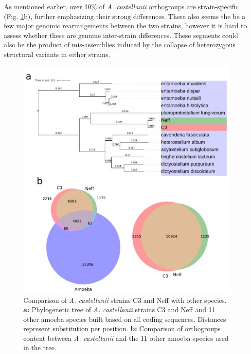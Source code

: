 As mentioned earlier, over 10\% of \textit{A. castellanii} orthogroups are strain-specific (Fig. \ref{fig:02-02:acas-comp}b), further emphasizing their strong differences. There also seems the be a few major genomic rearrangements between the two strains, however it is hard to assess whether these are genuine inter-strain differences. These segments could also be the product of mis-assemblies induced by the collapse of heterozygous structural variants in either strains.



\begin{figure}[htb]
    \includegraphics[width=\textwidth]{Parts/Part02/gfx/acas_comparative_genomics.pdf}
    \caption[Comparative genomics of \textit{A. castellanii}.]{Comparison of \textit{A. castellanii} strains C3 and Neff with other species. \textbf{a:} Phylogenetic tree of \textit{A. castellanii} strains C3 and Neff and 11 other amoeba species built based on all coding sequences. Distances represent substitution per position. \textbf{b:} Comparison of orthogroups content between \textit{A. castellanii} and the 11 other amoeba species used in the tree.}
    \label{fig:02-02:acas-comp}
\end{figure}

